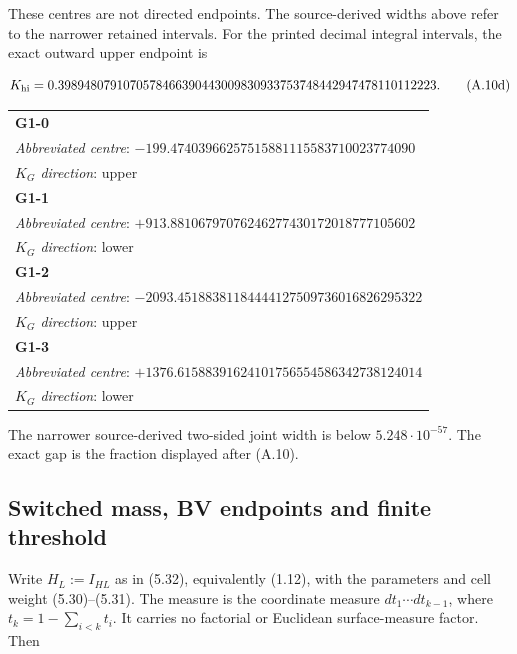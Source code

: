 {{\begin{longtable}{@{}p{\textwidth}@{}}
\bottomrule
\end{longtable}
}


These centres are not directed endpoints. The source-derived widths above
refer to the narrower retained intervals. For the printed decimal
integral intervals, the exact outward upper endpoint is

\[
 K_{\rm hi}=
 0.3989480791070578466390443009830933753748442947478110112223.
 \tag{A.10d}\label{eq:g1-khi}
\]


{
\normalsize
\setlength{\tabcolsep}{3pt}
\begin{longtable}{@{}p{\textwidth}@{}}
\toprule
\textbf{G1-0} \\
\emph{Abbreviated centre}: $-199.47403966257515881115583710023774090$ \\
\emph{$K_G$ direction}: upper \\
\midrule
\textbf{G1-1} \\
\emph{Abbreviated centre}: $+913.88106797076246277430172018777105602$ \\
\emph{$K_G$ direction}: lower \\
\midrule
\textbf{G1-2} \\
\emph{Abbreviated centre}: $-2093.45188381184444127509736016826295322$ \\
\emph{$K_G$ direction}: upper \\
\midrule
\textbf{G1-3} \\
\emph{Abbreviated centre}: $+1376.61588391624101756554586342738124014$ \\
\emph{$K_G$ direction}: lower \\

\bottomrule
\end{longtable}
}



The narrower source-derived two-sided joint width is below $5.248\cdot10^{-57}$.
The exact gap is the fraction displayed after (A.10).

\subsection{Switched mass, BV endpoints and finite threshold}

Write $H_L:=I_{HL}$ as in (5.32), equivalently (1.12), with the parameters
and cell weight (5.30)--(5.31). The measure is the coordinate measure $dt_1\cdots dt_{k-1}$,
where $t_k=1-\sum_{i<k}t_i$.
It carries no factorial or Euclidean surface-measure factor.
Then

}
